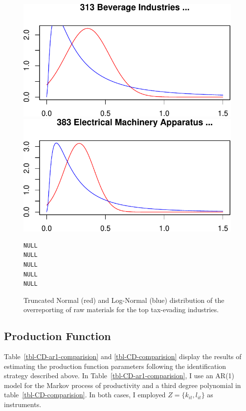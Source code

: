 \documentclass[
  12pt]{article}
\theoremstyle{definition}
\theoremstyle{remark}
\begin{document}
\begin{figure}
\begin{minipage}{\linewidth}
\includegraphics{Tax-Prod_files/figure-pdf/unnamed-chunk-36-4.pdf}

\includegraphics{Tax-Prod_files/figure-pdf/unnamed-chunk-36-5.pdf}

\begin{verbatim}
NULL
NULL
NULL
NULL
NULL
\end{verbatim}

\end{minipage}%

\caption{\label{fig-density-plots}Truncated Normal (red) and Log-Normal
(blue) distribution of the overreporting of raw materials for the top
tax-evading industries.}

\end{figure}%

\subsection{Production Function}\label{production-function}

Table~\ref{tbl-CD-ar1-comparision} and \ref{tbl-CD-comparision} display
the results of estimating the production function parameters following
the identification strategy described above. In
Table~\ref{tbl-CD-ar1-comparision}, I use an AR(1) model for the Markov
process of productivity and a third degree polynomial in
table~\ref{tbl-CD-comparision}. In both cases, I employed
\(Z=\{k_{it},l_{it}\}\) as instruments.
\end{document}
